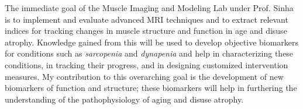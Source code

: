 The immediate goal of the Muscle Imaging and Modeling Lab under Prof. Sinha is to implement and evaluate advanced MRI techniques and to extract relevant indices for tracking changes in muscle structure and function in age and disuse atrophy. 
Knowledge gained from this will be used to develop objective biomarkers for conditions such as \textit{sarcopenia} and \textit{dynapenia} and help in characterizing these conditions, in tracking their progress, and in designing customized intervention measures. 
My contribution to this overarching goal is the development of new biomarkers of function and structure; these biomarkers will help in furthering the understanding of the pathophysiology of aging and disuse atrophy.
